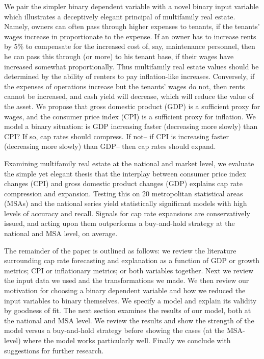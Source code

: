 We pair the simpler binary dependent variable with a novel binary input variable which illustrates a deceptively elegant principal of multifamily real estate. Namely, owners can often pass through higher expenses to tenants, if the tenants' wages increase in proportionate to the expense. If an owner has to increase rents by 5\% to compensate for the increased cost of, say, maintenance personnel, then he can pass this through (or more) to his tenant base, if their wages have increased somewhat proportionally. Thus multifamily real estate values should be determined by the ability of renters to pay inflation-like increases. Conversely, if the expenses of operations increase but the tenants' wages do not, then rents cannot be increased, and cash yield will decrease, which will reduce the value of the asset. We propose that gross domestic product (GDP) is a sufficient proxy for wages, and the consumer price index (CPI) is a sufficient proxy for inflation. We model a binary situation: is GDP increasing faster (decreasing more slowly) than CPI? If so, cap rates should compress. If not-- if CPI is increasing faster (decreasing more slowly) than GDP-- then cap rates should expand.

Examining multifamily real estate at the national and market level, we evaluate the simple yet elegant thesis that the interplay between consumer price index changes (CPI) and gross domestic product changes (GDP) explains cap rate compression and expansion. Testing this on 20 metropolitan statistical areas (MSAs) and the national series yield statistically significant models with high levels of accuracy and recall. Signals for cap rate expansions are conservatively issued, and acting upon them outperforms a buy-and-hold strategy at the national and MSA level, on average.

The remainder of the paper is outlined as follows: we review the literature surrounding cap rate forecasting and explanation as a function of GDP or growth metrics; CPI or inflationary metrics; or both variables together. Next we review the input data we used and the transformations we made. We then review our motivation for choosing a binary dependent variable and how we reduced the input variables to binary themselves. We specify a model and explain its validity by goodness of fit. The next section examines the results of our model, both at the national and MSA level. We review the results and show the strength of the model versus a buy-and-hold strategy before showing the cases (at the MSA-level) where the model works particularly well. Finally we conclude with suggestions for further research. 

